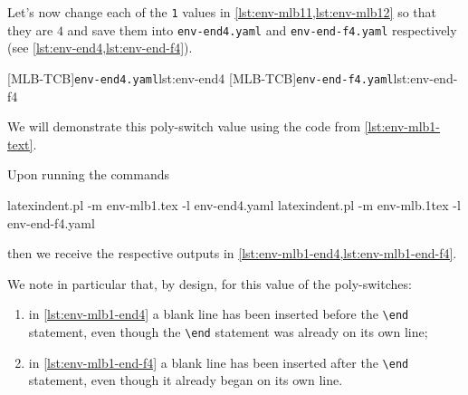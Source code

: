 \documentclass[10pt]{article}
\begin{document}
  \begin{example}
  Let's now change each of the \texttt{1} values in \cref{lst:env-mlb11,lst:env-mlb12} so
  that they are $4$ and save them into \texttt{env-end4.yaml} and
  \texttt{env-end-f4.yaml} respectively (see \cref{lst:env-end4,lst:env-end-f4}).

  \begin{cmhtcbraster}
   [MLB-TCB]{\texttt{env-end4.yaml}}{lst:env-end4}
   [MLB-TCB]{\texttt{env-end-f4.yaml}}{lst:env-end-f4}
  \end{cmhtcbraster}

  We will demonstrate this poly-switch value using the code from
  \vref{lst:env-mlb1-text}.

  Upon running the commands  

  \begin{commandshell}
latexindent.pl -m env-mlb1.tex -l env-end4.yaml
latexindent.pl -m env-mlb.1tex -l env-end-f4.yaml
\end{commandshell}

  then we receive the respective outputs in \cref{lst:env-mlb1-end4,lst:env-mlb1-end-f4}.

  \begin{cmhtcbraster}[raster column skip=.1\linewidth]
  \end{cmhtcbraster}

  We note in particular that, by design, for this value of the poly-switches:
  \begin{enumerate}
   \item in \cref{lst:env-mlb1-end4} a blank line has been inserted before the
         \lstinline!\end! statement, even though the \lstinline!\end! statement was
         already on its own line;
   \item in \cref{lst:env-mlb1-end-f4} a blank line has been inserted after the
         \lstinline!\end! statement, even though it already began on its own line.
  \end{enumerate}
  \end{example}
\end{document}
